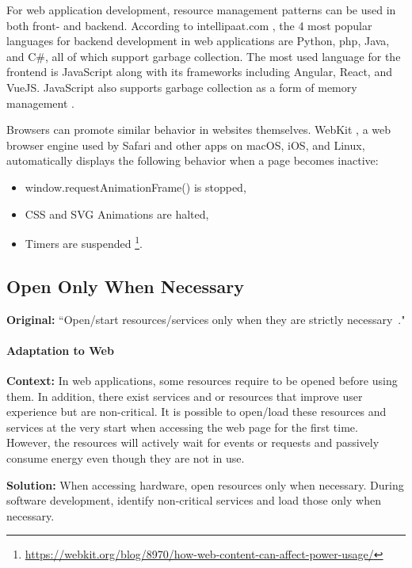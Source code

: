 For web application development, resource management patterns can be used in both front- and backend. According to intellipaat.com \cite{best-web-dev-languages}, the 4 most popular languages for backend development in web applications are Python, php, Java, and C\#, all of which support garbage collection. The most used language for the frontend is JavaScript along with its frameworks including Angular, React, and VueJS. JavaScript also supports garbage collection as a form of memory management \cite{dev_mozilla_memory_management}.

Browsers can promote similar behavior in websites themselves. WebKit \cite{webkit-website}, a web browser engine used by Safari and other apps on macOS, iOS, and Linux, automatically displays the following behavior when a page becomes inactive: 
\begin{itemize}
    \item window.requestAnimationFrame() is stopped,
    \item CSS and SVG Animations are halted,
    \item Timers are suspended \footnote{\url{https://webkit.org/blog/8970/how-web-content-can-affect-power-usage/}}.
\end{itemize}


\subsection{Open Only When Necessary} \label{sec:patterns-OpenOnlyWhenNecessary}
\textbf{Original:} ``Open/start resources/services only when they are strictly necessary~\cite{cruz2019catalog}."

\paragraph{Adaptation to Web}\mbox{}

\textbf{Context:} In web applications, some resources require to be opened before using them. In addition, there exist services and or resources that improve user experience but are non-critical. It is possible to open/load these resources and services at the very start when accessing the web page for the first time. However, the resources will actively wait for events or requests and passively consume energy even though they are not in use.

\textbf{Solution:} When accessing hardware, open resources only when necessary. During software development, identify non-critical services and load those only when necessary.

